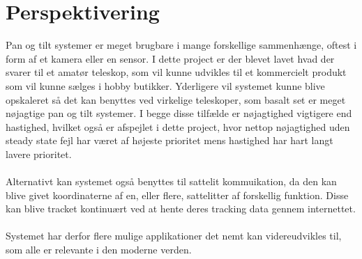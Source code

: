\section{Perspektivering}

Pan og tilt systemer er meget brugbare i mange forskellige sammenhænge, oftest i form af et kamera eller en sensor. I dette project er der blevet lavet hvad der svarer til et amatør teleskop, som vil kunne udvikles til et kommercielt produkt som vil kunne sælges i hobby butikker. Yderligere vil systemet kunne blive opskaleret så det kan benyttes ved virkelige teleskoper, som basalt set er meget nøjagtige pan og tilt systemer. I begge disse tilfælde er nøjagtighed vigtigere end hastighed, hvilket også er afspejlet i dette project, hvor nettop nøjagtighed uden steady state fejl har været af højeste prioritet mens hastighed har hart langt lavere prioritet.
\\
\\
Alternativt kan systemet også benyttes til sattelit kommuikation, da den kan blive givet koordinaterne af en, eller flere, sattelitter af forskellig funktion. Disse kan blive tracket kontinuært ved at hente deres tracking data gennem internettet.
\\
\\
Systemet har derfor flere mulige applikationer det nemt kan videreudvikles til, som alle er relevante i den moderne verden.


